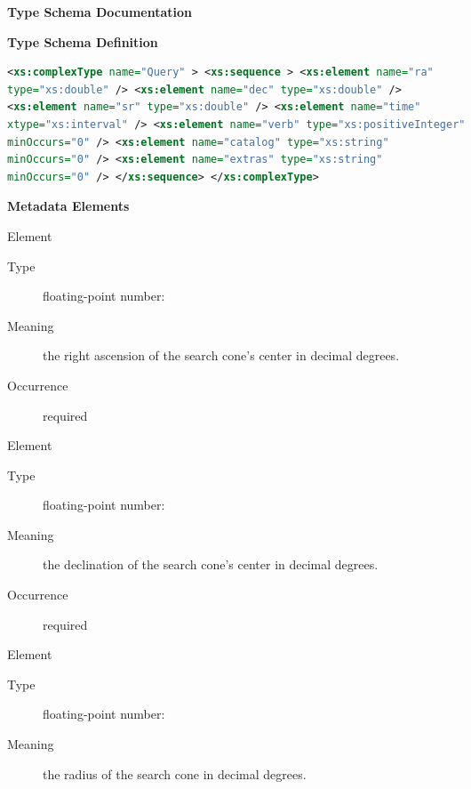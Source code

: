 \documentclass[11pt,a4paper]{ivoa} 
\begin{document}
\begin{generated} \begingroup \renewcommand*{}\vspace{2ex}\noindent\textbf{
Type Schema Documentation}


\vspace{1ex}\noindent\textbf{ Type Schema Definition}

\begin{lstlisting}[language=XML,basicstyle=\footnotesize]
<xs:complexType name="Query" > <xs:sequence > <xs:element name="ra"
type="xs:double" /> <xs:element name="dec" type="xs:double" />
<xs:element name="sr" type="xs:double" /> <xs:element name="time"
xtype="xs:interval" /> <xs:element name="verb" type="xs:positiveInteger"
minOccurs="0" /> <xs:element name="catalog" type="xs:string"
minOccurs="0" /> <xs:element name="extras" type="xs:string"
minOccurs="0" /> </xs:sequence> </xs:complexType> \end{lstlisting}

\vspace{0.5ex}\noindent\textbf{ Metadata Elements}

\begingroup\small\begin{bigdescription}\item[Element \xmlel{ra}]
\begin{description} \item[Type] floating-point number: 
\item[Meaning] the right ascension of the search cone's center in
decimal degrees.  
               
\item[Occurrence] required

\end{description} \item[Element \xmlel{dec}] \begin{description}
\item[Type] floating-point number:  \item[Meaning] the
declination of the search cone's center in decimal degrees.  
               
\item[Occurrence] required

\end{description} \item[Element \xmlel{sr}] \begin{description}
\item[Type] floating-point number:  \item[Meaning] the
radius of the search cone in decimal degrees.
               

\end{description}
\end{bigdescription}
\end{generated}
\end{document}
